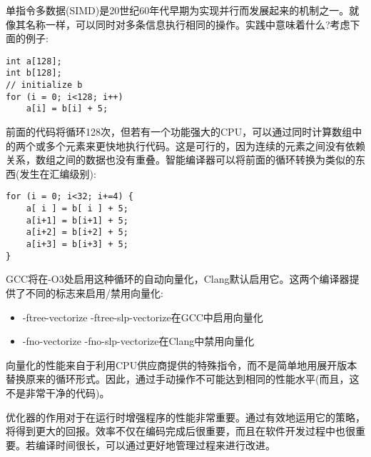 
单指令多数据(SIMD)是20世纪60年代早期为实现并行而发展起来的机制之一。就像其名称一样，可以同时对多条信息执行相同的操作。实践中意味着什么?考虑下面的例子:

\begin{lstlisting}[style=styleCXX]
int a[128];
int b[128];
// initialize b
for (i = 0; i<128; i++)
	a[i] = b[i] + 5;
\end{lstlisting}

前面的代码将循环128次，但若有一个功能强大的CPU，可以通过同时计算数组中的两个或多个元素来更快地执行代码。这是可行的，因为连续的元素之间没有依赖关系，数组之间的数据也没有重叠。智能编译器可以将前面的循环转换为类似的东西(发生在汇编级别):

\begin{lstlisting}[style=styleCXX]
for (i = 0; i<32; i+=4) {
	a[ i ] = b[ i ] + 5;
	a[i+1] = b[i+1] + 5;
	a[i+2] = b[i+2] + 5;
	a[i+3] = b[i+3] + 5;
}
\end{lstlisting}

GCC将在-O3处启用这种循环的自动向量化，Clang默认启用它。这两个编译器提供了不同的标志来启用/禁用向量化:

\begin{itemize}
\item 
-ftree-vectorize -ftree-slp-vectorize在GCC中启用向量化

\item 
-fno-vectorize -fno-slp-vectorize在Clang中禁用向量化
\end{itemize}

向量化的性能来自于利用CPU供应商提供的特殊指令，而不是简单地用展开版本替换原来的循环形式。因此，通过手动操作不可能达到相同的性能水平(而且，这不是非常干净的代码)。

优化器的作用对于在运行时增强程序的性能非常重要。通过有效地运用它的策略，将得到更大的回报。效率不仅在编码完成后很重要，而且在软件开发过程中也很重要。若编译时间很长，可以通过更好地管理过程来进行改进。




